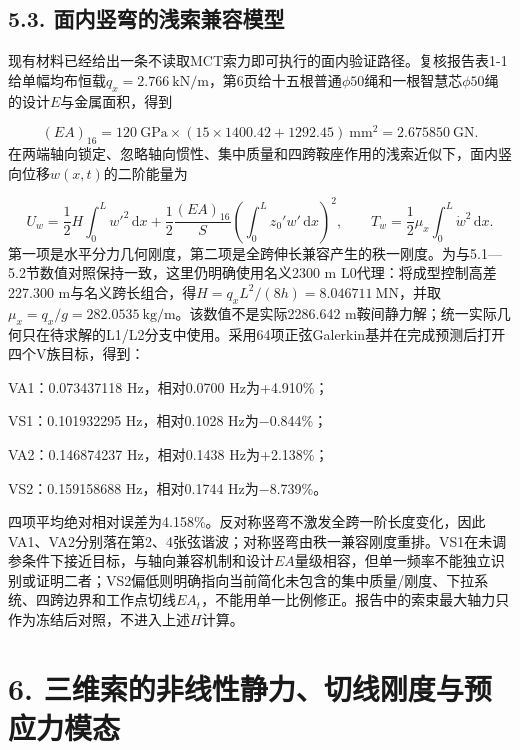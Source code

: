 \documentclass[UTF8,a4paper,11pt,fontset=none]{ctexart}
\begin{document}
\subsection*{5.3. 面内竖弯的浅索兼容模型}
现有材料已经给出一条不读取MCT索力即可执行的面内验证路径。复核报告表1-1给单幅均布恒载\(q_x=2.766\ \mathrm{kN/m}\)\allowbreak{}，第6页给十五根普通\(\phi50\)\allowbreak{}绳和一根智慧芯\(\phi50\)\allowbreak{}绳的设计\(E\)\allowbreak{}与金属面积，得到\par
\[
(EA)_{16}
=120\ \mathrm{GPa}\times
\left(15\times1400.42+1292.45\right)\ \mathrm{mm^2}
=2.675850\ \mathrm{GN}.
\]
在两端轴向锁定、忽略轴向惯性、集中质量和四跨鞍座作用的浅索近似下，面内竖向位移\(w(x,\allowbreak t)\)\allowbreak{}的二阶能量为\par
\[
U_w=\frac12H\int_0^L w'^2\,\mathrm dx
+\frac12\frac{(EA)_{16}}{S}
\left(\int_0^L z_0'w'\,\mathrm dx\right)^2,
\qquad
T_w=\frac12\mu_x\int_0^L\dot w^2\,\mathrm dx.
\]
第一项是水平分力几何刚度，第二项是全跨伸长兼容产生的秩一刚度。为与5.1—5.2节数值对照保持一致，这里仍明确使用名义2300 m L0代理：将成型控制高差227.300 m与名义跨长组合，得\(H=q_xL^2/(8h)=8.046711\ \mathrm{MN}\)\allowbreak{}，并取\(\mu_x=q_x/g=282.0535\ \mathrm{kg/m}\)\allowbreak{}。该数值不是实际2286.642 m鞍间静力解；统一实际几何只在待求解的L1/L2分支中使用。采用64项正弦Galerkin基并在完成预测后打开四个V族目标，得到：\par
VA1：0.073437118 Hz，相对0.0700 Hz为+4.910\%；\par
VS1：0.101932295 Hz，相对0.1028 Hz为−0.844\%；\par
VA2：0.146874237 Hz，相对0.1438 Hz为+2.138\%；\par
VS2：0.159158688 Hz，相对0.1744 Hz为−8.739\%。\par
四项平均绝对相对误差为4.158\%。反对称竖弯不激发全跨一阶长度变化，因此VA1、VA2分别落在第2、4张弦谐波；对称竖弯由秩一兼容刚度重排。VS1在未调参条件下接近目标，与轴向兼容机制和设计\(EA\)\allowbreak{}量级相容，但单一频率不能独立识别或证明二者；VS2偏低则明确指向当前简化未包含的集中质量/刚度、下拉系统、四跨边界和工作点切线\(EA_t\)\allowbreak{}，不能用单一比例修正。报告中的索束最大轴力只作为冻结后对照，不进入上述\(H\)\allowbreak{}计算。\par
{}
\section*{6. 三维索的非线性静力、切线刚度与预应力模态}
\end{document}

